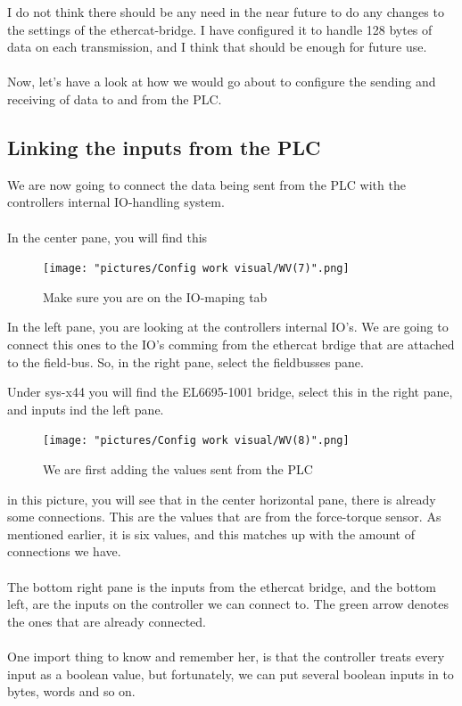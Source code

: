 \documentclass{article}
\begin{document}
I do not think there should be any need in the near future to do any changes to the settings of the ethercat-bridge. I have configured it to handle 128 bytes of data on each transmission, and 
I think that should be enough for future use. 
\\\\
Now, let's have a look at how we would go about to configure the sending and receiving of data to and from the PLC. 

\newpage

\subsection{Linking the inputs from the PLC}
We are now going to connect the data being sent from the PLC with the controllers internal IO-handling system. 
\\\\
In the center pane, you will find this

\begin{figure}[!h]
    \centering
    \texttt{[image: "pictures/Config work visual/WV(7)".png]}
    \caption{Make sure you are on the IO-maping tab }
    \label{fig:my_label}
\end{figure}
In the left pane, you are looking at the controllers internal IO's. We are going to connect this ones to the IO's comming from the ethercat brdige that are attached to the field-bus. So, in the right pane, select the fieldbusses pane. 

\newpage
Under sys-x44 you will find the EL6695-1001 bridge, select this in the right pane, and inputs ind the left pane.

\begin{figure}[!h]
    \centering
    \texttt{[image: "pictures/Config work visual/WV(8)".png]}
    \caption{We are first adding the values sent from the PLC}
    \label{fig:my_label}
\end{figure}

in this picture, you will see that in the center horizontal pane, there is already some connections. This are the values that are from the force-torque sensor. As mentioned earlier, it is six values, and this matches up with the amount of connections we have. 
\\\\
The bottom right pane is the inputs from the ethercat bridge, and the bottom left, are the inputs on the controller we can connect to. The green arrow denotes the ones that are already connected. 
\\\\
One import thing to know and remember her, is that the controller treats every input as a boolean value, but fortunately, we can put several boolean inputs in to bytes, words and so on.  
\end{document}
